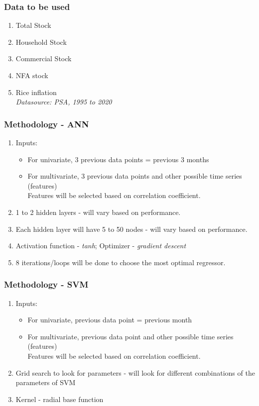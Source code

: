 \documentclass{beamer}
\begin{document}
\begin{frame}
	\frametitle{Data to be used}
	\begin{enumerate}
		\item Total Stock
		\item Household Stock
		\item Commercial Stock
		\item NFA stock
		\item Rice inflation \\
		\textit{Datasource: PSA, 1995 to 2020}
	\end{enumerate}
\end{frame}
\begin{frame}
\frametitle{Methodology - ANN}
\begin{enumerate}
	\item Inputs:
	\begin{itemize}
		\item For univariate, 3 previous data points = previous 3 months
		\item For multivariate, 3 previous data points and other possible time series (features)
		\\
		Features will be selected based on correlation coefficient.
	\end{itemize}
	\item 1 to 2 hidden layers - will vary based on performance.
	\item Each hidden layer will have 5 to 50 nodes - will vary based on performance.
	\item Activation function - \textit{tanh}; Optimizer - \textit{gradient descent}
	\item 8 iterations/loops will be done to choose the most optimal regressor.
\end{enumerate}
\end{frame}
\begin{frame}
	\frametitle{Methodology - SVM}
	\begin{enumerate}
	\item Inputs:
	\begin{itemize}
		\item For univariate, previous data point = previous month
		\item For multivariate, previous data point and other possible time series (features)
		\\
		Features will be selected based on correlation coefficient.
	\end{itemize}
		\item Grid search to look for parameters - will look for different combinations of the parameters of SVM
		\item Kernel - radial base function
	\end{enumerate}
\end{frame}
\end{document}
